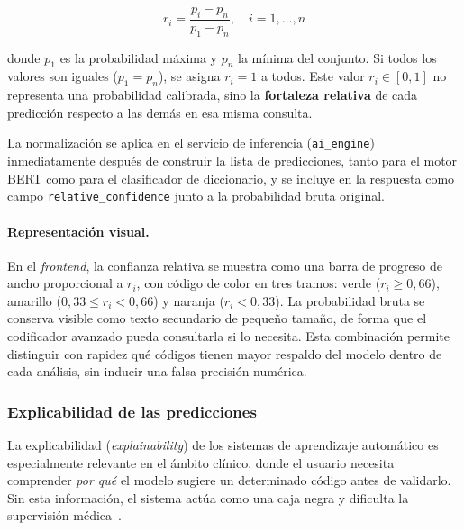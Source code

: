 \begin{equation}
 r_i = \frac{p_i - p_n}{p_1 - p_n}, \quad i = 1, \ldots, n
\end{equation}

donde $p_1$ es la probabilidad máxima y $p_n$ la mínima del conjunto. Si todos los valores son iguales ($p_1 = p_n$), se asigna $r_i = 1$ a todos. Este valor $r_i \in [0, 1]$ no representa una probabilidad calibrada, sino la \textbf{fortaleza relativa} de cada predicción respecto a las demás en esa misma consulta.

La normalización se aplica en el servicio de inferencia (\texttt{ai\_engine}) inmediatamente después de construir la lista de predicciones, tanto para el motor BERT como para el clasificador de diccionario, y se incluye en la respuesta como campo \texttt{relative\_confidence} junto a la probabilidad bruta original.

\paragraph{Representación visual.}
En el \emph{frontend}, la confianza relativa se muestra como una barra de progreso de ancho proporcional a $r_i$, con código de color en tres tramos: verde ($r_i \geq 0{,}66$), amarillo ($0{,}33 \leq r_i < 0{,}66$) y naranja ($r_i < 0{,}33$). La probabilidad bruta se conserva visible como texto secundario de pequeño tamaño, de forma que el codificador avanzado pueda consultarla si lo necesita. Esta combinación permite distinguir con rapidez qué códigos tienen mayor respaldo del modelo dentro de cada análisis, sin inducir una falsa precisión numérica.

\subsubsection{Explicabilidad de las predicciones}
\label{sec:explicabilidad}

La explicabilidad (\emph{explainability}) de los sistemas de aprendizaje automático es especialmente relevante en el ámbito clínico, donde el usuario necesita comprender \emph{por qué} el modelo sugiere un determinado código antes de validarlo. Sin esta información, el sistema actúa como una caja negra y dificulta la supervisión médica~\cite{Arrieta20}.

